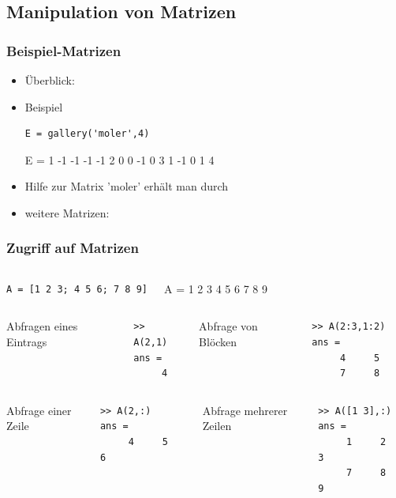 \documentclass[hyperref={xetex}]{beamer}
\begin{document}
\subsection{Manipulation von Matrizen}
%
%
\begin{frame}[fragile]\frametitle{Beispiel-Matrizen}
\begin{itemize}
\item Überblick: 
\item Beispiel
\begin{lstlisting}
E = gallery('moler',4)
\end{lstlisting}
\begin{matlab}
E =
     1    -1    -1    -1
    -1     2     0     0
    -1     0     3     1
    -1     0     1     4 
\end{matlab}

\item Hilfe zur Matrix 'moler' erhält man durch 
\item weitere Matrizen: 
\end{itemize}
\end{frame}
%
%
\begin{frame}[fragile]\frametitle{Zugriff auf Matrizen}
\begin{columns}[c]%
%
\begin{lstlisting}[basicstyle=\tiny]
A = [1 2 3; 4 5 6; 7 8 9]
\end{lstlisting}%
\begin{matlab}
A =
     1     2     3
     4     5     6
     7     8     9 
\end{matlab}%
\end{columns}%
\begin{columns}[t,onlytextwidth]
Abfragen eines Eintrags
\begin{lstlisting}
>> A(2,1)
ans =
     4
\end{lstlisting}
Abfrage von Blöcken
\begin{lstlisting}
>> A(2:3,1:2)
ans =
     4     5     
     7     8     
\end{lstlisting}
\end{columns}
\begin{columns}[t,onlytextwidth]
Abfrage einer Zeile
\begin{lstlisting}
>> A(2,:)
ans =
     4     5     6
\end{lstlisting}
Abfrage mehrerer Zeilen
\begin{lstlisting}
>> A([1 3],:)
ans =
     1     2     3
     7     8     9
\end{lstlisting}
\end{columns}
\end{frame}
\end{document}
